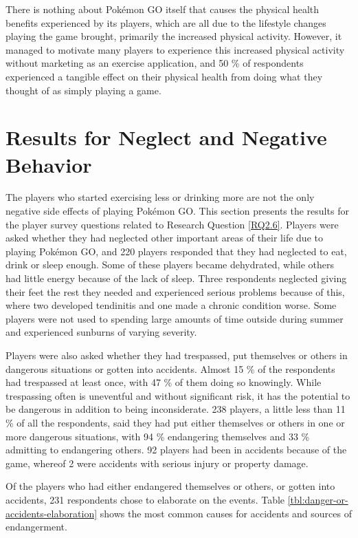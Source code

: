 There is nothing about Pokémon GO itself that causes the physical health benefits experienced by its players, which are all due to the lifestyle changes playing the game brought, primarily the increased physical activity. However, it managed to motivate many players to experience this increased physical activity without marketing as an exercise application, and 50 \% of respondents experienced a tangible effect on their physical health from doing what they thought of as simply playing a game. 


\section{Results for Neglect and Negative Behavior}

The players who started exercising less or drinking more are not the only negative side effects of playing Pokémon GO. This section presents the results for the player survey questions related to Research Question \ref{RQ2.6}. Players were asked whether they had neglected other important areas of their life due to playing Pokémon GO, and 220 players responded that they had neglected to eat, drink or sleep enough. Some of these players became dehydrated, while others had little energy because of the lack of sleep. Three respondents neglected giving their feet the rest they needed and experienced serious problems because of this, where two developed tendinitis and one made a chronic condition worse. Some players were not used to spending large amounts of time outside during summer and experienced sunburns of varying severity.

Players were also asked whether they had trespassed, put themselves or others in dangerous situations or gotten into accidents. Almost 15 \% of the respondents had trespassed at least once, with 47 \% of them doing so knowingly. While trespassing often is uneventful and without significant risk, it has the potential to be dangerous in addition to being inconsiderate. 238 players, a little less than 11 \% of all the respondents, said they had put either themselves or others in one or more dangerous situations, with 94 \% endangering themselves and 33 \% admitting to endangering others. 92 players had been in accidents because of the game, whereof 2 were accidents with serious injury or property damage.

Of the players who had either endangered themselves or others, or gotten into accidents, 231 respondents chose to elaborate on the events. Table \ref{tbl:danger-or-accidents-elaboration} shows the most common causes for accidents and sources of endangerment.

